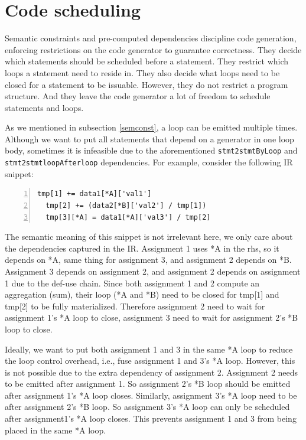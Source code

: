 \documentclass[sigplan, nonacm]{acmart}\settopmatter{printfolios=true,printccs=false,printacmref=false}
\begin{document}
\section{Code scheduling}\label{codeschedule}
\iffalse
Semantic constraints and pre-computed dependencies discipline code generation, enforcing restrictions on the code generator to guarantee correctness. They decide which statements should be scheduled before a statement. They restrict which loops a statement need to reside in. They also decide what loops need to be closed for a statement to be issuable.  However, they do not restrict a program structure. And they leave the code generator a lot of freedom to schedule statements and loops. \par
As we mentioned in subsection \ref{semconst}, a loop can be emitted multiple times. Although we want to put all statements that depend on a generator in one loop body, sometimes it is infeasible due to the aforementioned \texttt{stmt2stmtByLoop} and \texttt{stmt2stmtloopAfterloop} dependencies. For example, consider the following IR snippet:
\begin{lstlisting}[numbers=left]
  tmp[1] += data1[*A]['val1']
  tmp[2] += (data2[*B]['val2'] / tmp[1])
  tmp[3][*A] = data1[*A]['val3'] / tmp[2]
  \end{lstlisting}
The semantic meaning of this snippet is not irrelevant here, we only care about the dependencies captured in the IR. Assignment 1 uses *A in the rhs, so it depends on *A, same thing for assignment 3, and assignment 2 depends on *B. Assignment 3 depends on assignment 2, and assignment 2 depends on assignment 1 due to the def-use chain. Since both assignment 1 and 2 compute an aggregation (sum), their loop (*A and *B) need to be closed for tmp[1] and tmp[2] to be fully materialized. Therefore assignment 2 need to wait for assignment 1's *A loop to close, assignment 3 need to wait for assignment 2's *B loop to close.\par
Ideally, we want to put both assignment 1 and 3 in the same *A loop to reduce the loop control overhead, i.e., fuse assignment 1 and 3's *A loop. However, this is not possible due to the extra dependency of assignment 2. Assignment 2 needs to be emitted after assignment 1. So assignment 2's *B loop should be emitted after assignment 1's *A loop closes. Similarly, assignment 3's *A loop need to be after assignment 2's *B loop. So assignment 3's *A loop can only be scheduled after assignment1's *A loop closes. This prevents assignment 1 and 3 from being placed in the same *A loop.\par
\end{document}
